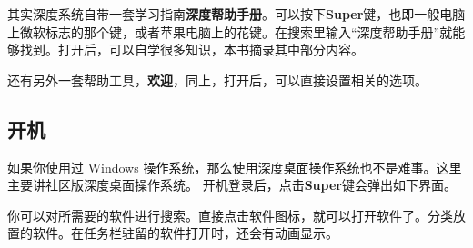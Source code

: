 \documentclass[doctor,openright,twoside]{sjtuthesis}
\theoremstyle{plain}
\theoremstyle{definition}
\theoremstyle{remark}
\theoremstyle{ocrenumbox}
\theoremstyle{plain}
\newcommand\cqh{“}
\newcommand\cqt{”}
\begin{document}
其实深度系统自带一套学习指南\textbf{深度帮助手册}。可以按下\textbf{Super}键，也即一般电脑上微软标志的那个键，或者苹果电脑上的花键。在搜索里输入\cqh 深度帮助手册\cqt 就能够找到。打开后，可以自学很多知识，本书摘录其中部分内容。

还有另外一套帮助工具，\textbf{欢迎}，同上，打开后，可以直接设置相关的选项。

\subsection{开机}

如果你使用过 Windows
操作系统，那么使用深度桌面操作系统也不是难事。这里主要讲社区版深度桌面操作系统。
开机登录后，点击\textbf{Super}键会弹出如下界面。


你可以对所需要的软件进行搜索。直接点击软件图标，就可以打开软件了。分类放置的软件。在任务栏驻留的软件打开时，还会有动画显示。

\end{document}
